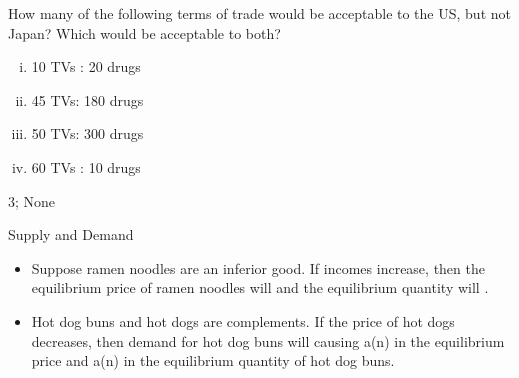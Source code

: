 \documentclass[pdf, handout]{beamer}
\begin{document}
\begin{frame}
	
How many of the following terms of trade would be acceptable to the US, but not Japan? Which would be acceptable to both?

\begin{enumerate}[(i)]
	\item 10 TVs : 20 drugs
	\item 45 TVs: 180 drugs
	\item 50 TVs: 300 drugs
	\item 60 TVs : 10 drugs 
\end{enumerate}
\vspace{1.5cm}

\pause
\begin{flushright}
	\color{red} 3; None
\end{flushright}

\end{frame}

\begin{frame}{Supply and Demand}
	
\begin{itemize}
	\item Suppose ramen noodles are an inferior good. If incomes increase, then the equilibrium price of ramen noodles will \underline{\hspace{2cm}} and the equilibrium quantity will \underline{\hspace{2cm}}.
	\pause
	\pause
	\item Hot dog buns and hot dogs are complements. If the price of hot dogs decreases, then demand for hot dog buns will \underline{\hspace{2cm}} causing a(n) \underline{\hspace{2cm}} in the equilibrium price and a(n) \underline{\hspace{2cm}} in the equilibrium quantity of hot dog buns.
	
	\pause
	
\end{itemize}

\end{frame}
\end{document}
